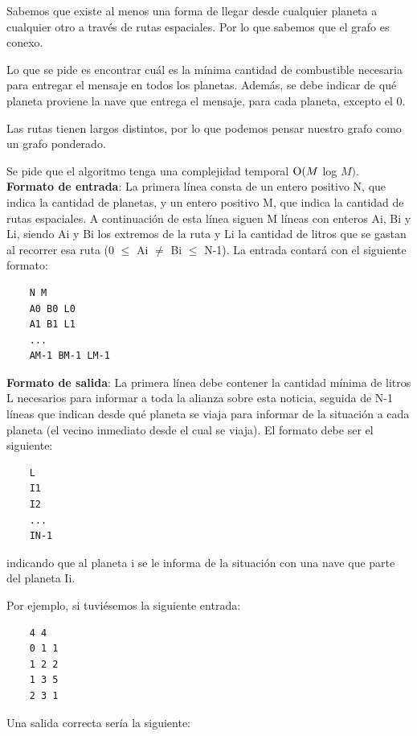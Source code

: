     Sabemos que existe al menos una forma de llegar desde cualquier planeta a cualquier otro a través de rutas espaciales. Por lo que sabemos que el grafo es conexo.

    Lo que se pide es encontrar cuál es la mínima cantidad de combustible necesaria para entregar el mensaje en todos los planetas. Además, se debe indicar de qué planeta proviene la nave que entrega el mensaje, para cada planeta, excepto el 0.

    Las rutas tienen largos distintos, por lo que podemos pensar nuestro grafo como un grafo ponderado.

    Se pide que el algoritmo tenga una complejidad temporal $\operatorname{O}(M$ log $M)$. \\

    \textbf{Formato de entrada}: La primera línea consta de un entero positivo N, que indica la cantidad de planetas, y un entero positivo M, que indica la cantidad de rutas espaciales. A continuación de esta línea siguen M líneas con enteros Ai, Bi y Li, siendo Ai y Bi los extremos de la ruta y Li la cantidad de litros que se gastan al recorrer esa ruta (0 $\leq$ Ai $\neq$ Bi $\leq$ N-1). La entrada contará con el siguiente formato:

    \begin{verbatim}
    N M
    A0 B0 L0 
    A1 B1 L1 
    ...
    AM-1 BM-1 LM-1
    \end{verbatim}

    \textbf{Formato de salida}: La primera línea debe contener la cantidad mínima de litros L necesarios para informar a toda la alianza sobre esta noticia, seguida de N-1 líneas que indican desde qué planeta se viaja para informar de la situación a cada planeta (el vecino inmediato desde el cual se viaja). El formato debe ser el siguiente:
    
    \begin{verbatim}
    L
    I1
    I2
    ...
    IN-1
    \end{verbatim}

    indicando que al planeta i se le informa de la situación con una nave que parte del planeta Ii.

    Por ejemplo, si tuviésemos la siguiente entrada:

    \begin{verbatim}
    4 4
    0 1 1
    1 2 2
    1 3 5
    2 3 1
    \end{verbatim}

    Una salida correcta sería la siguiente:

